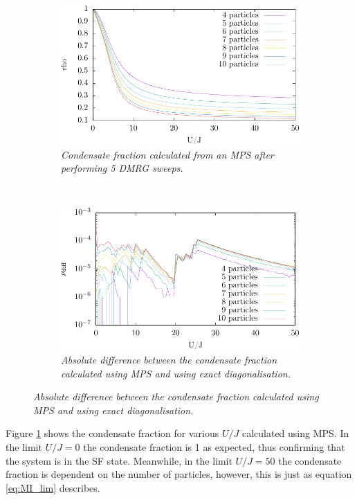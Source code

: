 \begin{figure}[h!]
    \centering
    \begin{subfigure}[t]{0.49\textwidth}
        \includegraphics[width=\textwidth]{Figures/Condfrac_4to10.pdf}
        \caption{\textit{Condensate fraction calculated from an MPS after performing 5 DMRG sweeps.}}
        \label{fig:Condfrac_4to10}
    \end{subfigure}
    ~
    \begin{subfigure}[t]{0.49\textwidth}
        \includegraphics[width=\textwidth]{Figures/Confrac_exactvsMPS.pdf}
        \caption{\textit{Absolute difference between the condensate fraction calculated using MPS and using exact diagonalisation.}}
        \label{fig:Condfrac_exactvsMPS}
    \end{subfigure}
    
\end{figure}
Figure \ref{fig:Condfrac_4to10} shows the condensate fraction for various $U/J$ calculated using MPS. In the limit $U/J = 0$ the condensate fraction is 1 as expected, thus confirming that the system is in the SF state. Meanwhile, in the limit $U/J = 50$ the condensate fraction is dependent on the number of particles, however, this is just as equation \ref{eq:MI_lim} describes.\\
